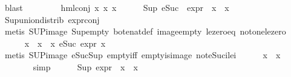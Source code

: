 \begin{isabellebody}
\ blast\isanewline
\ \ \isamarkupfalse%
\isanewline
\ \ \ \ \isamarkupfalse%
\ {\isacharparenleft}{\kern0pt}hml{\isacharunderscore}{\kern0pt}conj\ x{}\ x{}\ x{}{\isacharparenright}{\kern0pt}\isanewline
\ \ \ \ \isamarkupfalse%
\ {\isachardoublequoteopen}Sup\ {\isacharparenleft}{\kern0pt}{\isacharparenleft}{\kern0pt}eSuc\ {\isasymcirc}\ expr{\isacharunderscore}{\kern0pt}{}\ {\isasymcirc}\ x{}{\isacharparenright}{\kern0pt}\ {\isacharbackquote}{\kern0pt}\ x{}{\isacharparenright}{\kern0pt}\ {\isasymle}\ {}{\isachardoublequoteclose}\isanewline
\ \ \ \ \ \ \isamarkupfalse%
\ Sup{\isacharunderscore}{\kern0pt}union{\isacharunderscore}{\kern0pt}distrib\ expr{\isacharunderscore}{\kern0pt}{}{\isacharunderscore}{\kern0pt}conj\isanewline
\ \ \ \ \ \ \isamarkupfalse%
\ {\isacharparenleft}{\kern0pt}metis\ SUP{\isacharunderscore}{\kern0pt}image\ Sup{\isacharunderscore}{\kern0pt}empty\ bot{\isacharunderscore}{\kern0pt}enat{\isacharunderscore}{\kern0pt}def\ image{\isacharunderscore}{\kern0pt}empty\ le{\isacharunderscore}{\kern0pt}zero{\isacharunderscore}{\kern0pt}eq\ not{\isacharunderscore}{\kern0pt}one{\isacharunderscore}{\kern0pt}le{\isacharunderscore}{\kern0pt}zero{\isacharparenright}{\kern0pt}\isanewline
\ \ \ \ \isamarkupfalse%
\ {\isachardoublequoteopen}{\isasymforall}x\ {\isasymin}\ x{}\ {\isacharbackquote}{\kern0pt}\ x{}{\isachardot}{\kern0pt}\ eSuc\ {\isacharparenleft}{\kern0pt}expr{\isacharunderscore}{\kern0pt}{}\ x{\isacharparenright}{\kern0pt}\ {\isasymle}\ {}{\isachardoublequoteclose}\isanewline
\ \ \ \ \ \ \isamarkupfalse%
\ {\isacharparenleft}{\kern0pt}metis\ SUP{\isacharunderscore}{\kern0pt}image\ eSuc{\isacharunderscore}{\kern0pt}Sup\ empty{\isacharunderscore}{\kern0pt}iff\ empty{\isacharunderscore}{\kern0pt}is{\isacharunderscore}{\kern0pt}image\ not{\isacharunderscore}{\kern0pt}eSuc{\isacharunderscore}{\kern0pt}ilei{}{\isacharparenright}{\kern0pt}\isanewline
\ \ \ \ \isamarkupfalse%
\ {\isachardoublequoteopen}x{}\ {\isacharbackquote}{\kern0pt}\ x{}\ {\isacharequal}{\kern0pt}\ {\isacharbraceleft}{\kern0pt}{\isacharbraceright}{\kern0pt}{\isachardoublequoteclose}\isanewline
\ \ \ \ \ \ \isamarkupfalse%
\ simp\isanewline
\ \ \ \ \isamarkupfalse%
\ {\isachardoublequoteopen}Sup\ {\isacharparenleft}{\kern0pt}{\isacharparenleft}{\kern0pt}expr{\isacharunderscore}{\kern0pt}{}\ {\isasymcirc}\ x{}{\isacharparenright}{\kern0pt}\ {\isacharbackquote}{\kern0pt}\ x{}{\isacharparenright}{\kern0pt}\ {\isasymle}\ {}{\isachardoublequoteclose}\isanewline

\end{isabellebody}
